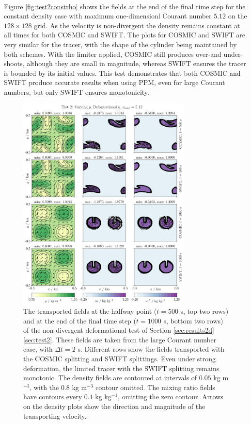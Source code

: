 \documentclass{ametsocV6.1}
\begin{document}
\\
Figure \ref{fig:test2constrho} shows the fields at the end of the final time step for the constant density case with maximum one-dimensionl Courant number $5.12$ on the $128\times128$ grid. As the velocity is non-divergent the density remains constant at all times for both COSMIC and SWIFT. The plots for COSMIC and SWIFT are very similar for the tracer, with the shape of the cylinder being maintained by both schemes. With the limiter applied, COSMIC still produces over-and under-shoots, although they are small in magnitude, whereas SWIFT ensures the tracer is bounded by its initial values. This test demonstrates that both COSMIC and SWIFT produce accurate results when using PPM, even for large Courant numbers, but only SWIFT ensures monotonicity. \\
\begin{figure}[ht!]
\centering
\includegraphics[width=0.78\textwidth]{fig_4_deformational.jpg}
\caption{The transported fields at the halfway point ($t=500$ s, top two rows) and at the end of the final time step ($t=1000$ s, bottom two rows) of the non-divergent deformational test of Section \ref{sec:results2d}\ref{sec:test2}. These fields are taken from the large Courant number case, with $\Delta t=2$ s. Different rows show the fields transported with the COSMIC splitting and SWIFT splittings.
Even under strong deformation, the limited tracer with the SWIFT splitting remains monotonic.
The density fields are contoured at intervals of $0.05$ kg m$^{-3}$, with the $0.8$ kg m$^{-3}$ contour omitted.
The mixing ratio fields have contours every $0.1$ kg kg$^{-1}$, omitting the zero contour.
Arrows on the density plots show the direction and magnitude of the transporting velocity.}\label{fig:test2}
\end{figure} 
\end{document}
